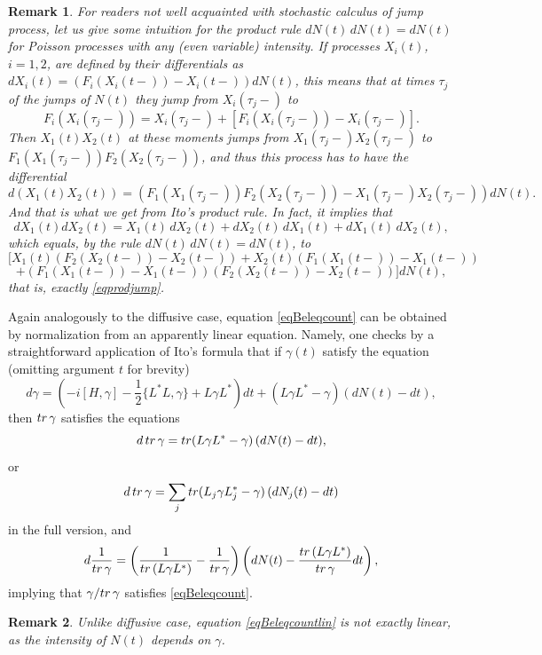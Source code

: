 \documentclass[10pt,a4paper]{amsart}
\def\tr{\rm{tr}}
\def\ga{\gamma}
\newtheorem{remark}{Remark}
\begin{document}
\begin{remark}For readers not well acquainted with stochastic calculus of jump process,
 let us give some intuition for the product rule $dN(t)\,dN(t)=dN(t)$ for Poisson processes
 with any (even variable) intensity. If processes $X_i(t)$, $i=1,2$, are defined by
 their differentials as $dX_i(t)=(F_i(X_i(t-))-X_i(t-)) dN(t)$, this means that at times $\tau_j$
 of the jumps of $N(t)$ they jump from $X_i(\tau_j-)$ to
 \[
 F_i(X_i(\tau_j-))= X_i(\tau_j-)+[F_i(X_i(\tau_j-))-X_i(\tau_j-)].
 \]
 Then $X_1(t)X_2(t)$ at these moments jumps from $X_1(\tau_j-)X_2(\tau_j-)$
 to $F_1(X_1(\tau_j-))F_2(X_2(\tau_j-))$, and thus this process has to have the differential
 \begin{equation}
 \label{eqprodjump}
 d(X_1(t)X_2(t))=\left( F_1(X_1(\tau_j-))F_2(X_2(\tau_j-))-X_1(\tau_j-)X_2(\tau_j-)\right) dN(t).
 \end{equation}
 And that is what we get from Ito's product rule. In fact, it implies that
 \[
 dX_1(t)dX_2(t)=X_1(t) \, dX_2(t)+dX_2(t) \, dX_1(t)+dX_1(t)\, dX_2(t),
 \]
 which equals, by the rule $dN(t)\,dN(t)=dN(t)$, to
 \[
\bigl[ X_1(t)(F_2(X_2(t-))-X_2(t-))+X_2(t) (F_1(X_1(t-))-X_1(t-))
 \]
 \[
 +(F_1(X_1(t-))-X_1(t-)) (F_2(X_2(t-))-X_2(t-))\bigr] dN(t),
 \]
 that is, exactly \eqref{eqprodjump}.
\end{remark}

Again analogously to the diffusive case, equation \eqref{eqBeleqcount} can be obtained
by normalization from an apparently linear equation. Namely, one checks by a straightforward
application of Ito's formula that if $\ga(t)$ satisfy the equation (omitting argument $t$ for brevity)
 \begin{equation}
\label{eqBeleqcountlin}
d\ga=(- i[H, \ga] -\frac12 \{L^*L,\ga\}+ L\ga L^* ) dt
+(L\ga L^*-\ga) (dN(t)-dt),
\end{equation}
then ${\tr \, \ga}$ satisfies the equations
\[
d\, {\tr}\, \ga={\tr} (L\ga L^*-\ga) \, (dN(t)-dt),
\]
or
\[
d\, {\tr}\, \ga=\sum_j {\tr} (L_j\ga L_j^*-\ga) \, (dN_j(t)-dt)
\]
in the full version, and
\[
d\frac{1}{{\tr}\, \ga}=\left(\frac{1}{{\tr}\,(L\ga L^*)}-\frac{1}{{\tr}\, \ga }\right)
\left(dN(t)-\frac{{\tr}\, (L\ga L^*)}{{\tr}\, \ga} dt\right),
\]
implying that $\ga/{\tr}\,\ga$ satisfies \eqref{eqBeleqcount}.

\begin{remark}
Unlike diffusive case, equation \eqref{eqBeleqcountlin} is not exactly linear,
as the intensity of $N(t)$ depends on $\ga$.
\end{remark}
\end{document}

